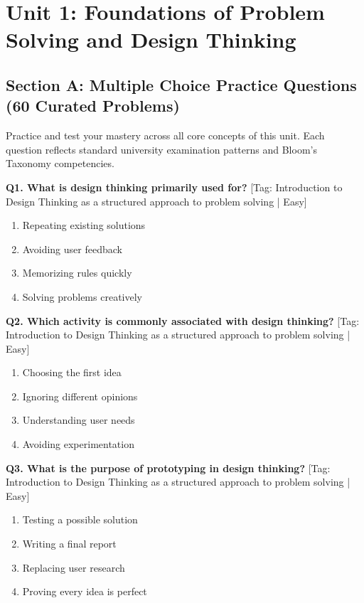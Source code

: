 \chapter{Unit 1: Foundations of Problem Solving and Design Thinking}


\section{Section A: Multiple Choice Practice Questions (60 Curated Problems)}

\noindent Practice and test your mastery across all core concepts of this unit. Each question reflects standard university examination patterns and Bloom's Taxonomy competencies.
\vspace{3mm}

\noindent\textbf{Q1. What is design thinking primarily used for?} \hfill [Tag: Introduction to Design Thinking as a structured approach to problem solving | Easy]
\begin{enumerate}[label=(\alph*),topsep=2pt,itemsep=1pt,partopsep=0pt,parsep=0pt]
    \item {Repeating existing solutions}
    \item {Avoiding user feedback}
    \item {Memorizing rules quickly}
    \item {Solving problems creatively}
\end{enumerate}
\vspace{2mm}

\noindent\textbf{Q2. Which activity is commonly associated with design thinking?} \hfill [Tag: Introduction to Design Thinking as a structured approach to problem solving | Easy]
\begin{enumerate}[label=(\alph*),topsep=2pt,itemsep=1pt,partopsep=0pt,parsep=0pt]
    \item {Choosing the first idea}
    \item {Ignoring different opinions}
    \item {Understanding user needs}
    \item {Avoiding experimentation}
\end{enumerate}
\vspace{2mm}

\noindent\textbf{Q3. What is the purpose of prototyping in design thinking?} \hfill [Tag: Introduction to Design Thinking as a structured approach to problem solving | Easy]
\begin{enumerate}[label=(\alph*),topsep=2pt,itemsep=1pt,partopsep=0pt,parsep=0pt]
    \item {Testing a possible solution}
    \item {Writing a final report}
    \item {Replacing user research}
    \item {Proving every idea is perfect}
\end{enumerate}
\vspace{2mm}

